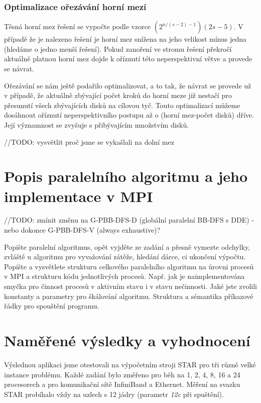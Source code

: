 \documentclass[12pt]{article}
\begin{document}
\subsubsection{Optimalizace ořezávání horní mezí}
Těsná horní mez řešení se vypočte podle vzorce $(2^{n/(s-2)-1})(2s-5)$. V případě že je nalezeno řešení je horní mez snížena na jeho velikost mínus jedna (hledáme o jedno menší řešení). Pokud zanoření ve stromu řešení překročí aktuálně platnou horní mez dojde k oříznutí této neperspektivní větve a provede se návrat. 

Ořezávání se nám ještě podařilo optimalizovat, a to tak, že návrat se provede už v případě, že aktuálně zbývající počet kroků do horní meze již nestačí pro přesunutí všech zbývajících disků na cílovou tyč. Touto optimalizací můžeme dosáhnout oříznutí neperspektivního postupu až o (horní mez-počet disků) dříve. Její významnost se zvyšuje s přibývajícím množstvím disků.



//TODO: vysvětlit proč jsme se vykašlali na dolní mez

\section{Popis paralelního algoritmu a jeho implementace v MPI}

//TODO: zmínit změnu na G-PBB-DFS-D (globální paralelní BB-DFS s DDE) - nebo dokonce G-PBB-DFS-V (always exhaustive)?




Popište paralelní algoritmus, opět vyjděte ze zadání a přesně
vymezte odchylky, zvláště u algoritmu pro vyvažování zátěže, hledání
dárce, ci ukončení výpočtu.  Popište a vysvětlete strukturu
celkového paralelního algoritmu na úrovni procesů v MPI a strukturu
kódu jednotlivých procesů. Např. jak je naimplementována smyčka pro
činnost procesů v aktivním stavu i v stavu nečinnosti. Jaké jste
zvolili konstanty a parametry pro škálování algoritmu. Struktura a
sémantika příkazové řádky pro spouštění programu.

\section{Naměřené výsledky a vyhodnocení}

Výslednou aplikaci jsme otestovali na výpočetním stroji STAR pro tři různě velké instance problému. Každé zadání bylo změřeno pro běh na 1, 2, 4, 8, 16 a 24 procesorech a pro komunikační sítě InfiniBand a Ethernet. Měření na svazku STAR probíhalo vždy na uzlech s 12 jádry (parametr \textit{12c} při spuštění).
\end{document}
